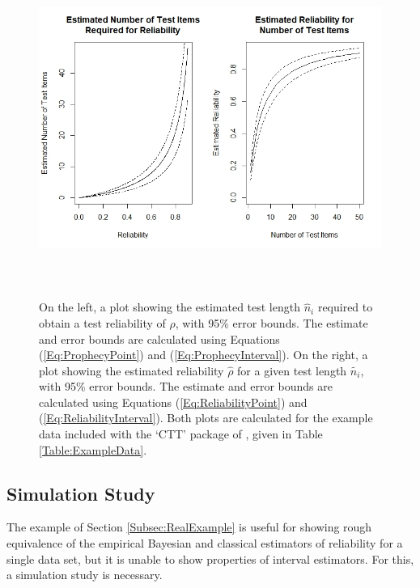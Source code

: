 \documentclass[12pt,epsfig]{article}
\begin{document}
\begin{figure}
    \centering
    \includegraphics[height = 110mm]{Plots.jpeg}
    \caption{On the left, a plot showing the estimated test length $\hat{n}_i$ required to obtain a test reliability of $\rho$, with 95\% error bounds. The estimate and error bounds are calculated using Equations (\ref{Eq:ProphecyPoint}) and (\ref{Eq:ProphecyInterval}). On the right, a plot showing the estimated reliability $\hat{\rho}$ for a given test length $\tilde{n_i}$, with 95\% error bounds. The estimate and error bounds are calculated using Equations (\ref{Eq:ReliabilityPoint}) and (\ref{Eq:ReliabilityInterval}). Both plots are calculated for the example data included with the `CTT' package of \cite{Willse2018}, given in Table \ref{Table:ExampleData}.}
    \label{Fig:ErrorPlots}
\end{figure}


\subsection{Simulation Study}
\label{Subsec:Simulation}

The example of Section \ref{Subsec:RealExample} is useful for showing rough equivalence of the empirical Bayesian and classical estimators of reliability for a single data set, but it is unable to show properties of interval estimators. For this, a simulation study is necessary.
\end{document}
